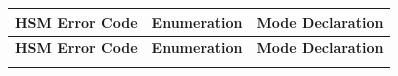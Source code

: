 \begin{longtable}{|l|l|l|}
\hline
\begin{minipage}{0.38\linewidth}\raggedright\vspace{.75ex}\textbf{HSM Error Code}\vspace{.75ex}\end{minipage} & \begin{minipage}{0.15\linewidth}\raggedright\vspace{.75ex}\textbf{Enumeration}\vspace{.75ex}\end{minipage} & \begin{minipage}{0.38\linewidth}\raggedright\vspace{.75ex}\textbf{Mode Declaration}\vspace{.75ex}\end{minipage}\\
\hline\hline
\endfirsthead
\hline
\begin{minipage}{0.38\linewidth}\raggedright\vspace{.75ex}\textbf{HSM Error Code}\vspace{.75ex}\end{minipage} & \begin{minipage}{0.15\linewidth}\raggedright\vspace{.75ex}\textbf{Enumeration}\vspace{.75ex}\end{minipage} & \begin{minipage}{0.38\linewidth}\raggedright\vspace{.75ex}\textbf{Mode Declaration}\vspace{.75ex}\end{minipage}\\
\hline\hline
\endhead
\hline
\endfoot
\hline
\endlastfoot
\end{longtable}
